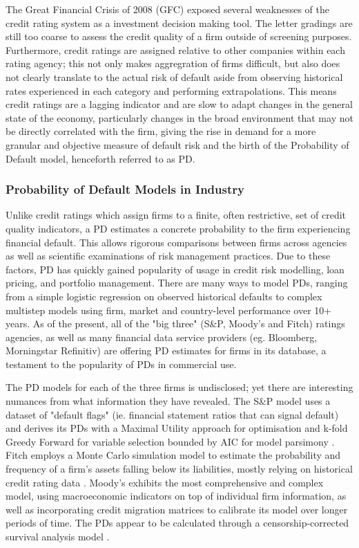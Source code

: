 \documentclass[10pt]{article}
\begin{document}
\begin{multicols*}{2}
The Great Financial Crisis of 2008 (GFC) exposed several weaknesses of the credit rating system as a investment decision making tool. The letter gradings are still too coarse to assess the credit quality of a firm outside of screening purposes.
Furthermore, credit ratings are assigned relative to other companies within each rating agency; this not only makes aggregration of firms difficult, but also does not clearly translate to the actual risk of default aside from observing historical rates experienced in each category and performing extrapolations.
This means credit ratings are a lagging indicator and are slow to adapt changes in the general state of the economy, particularly changes in the broad environment that may not be directly correlated with the firm, giving the rise in demand for a more granular and objective measure of default risk and the birth of the Probability of Default model, henceforth referred to as PD.
    
\subsubsection{Probability of Default Models in Industry}\label{industry}

Unlike credit ratings which assign firms to a finite, often restrictive, set of credit quality indicators, a PD estimates a concrete probability to the firm experiencing financial default.
This allows rigorous comparisons between firms across agencies as well as scientific examinations of risk management practices. Due to these factors, PD has quickly gained popularity of usage in credit risk modelling, loan pricing, and portfolio management.
There are many ways to model PDs, ranging from a simple logistic regression on observed historical defaults to complex multistep models using firm, market and country-level performance over 10+ years. 
As of the present, all of the "big three" (S\&P, Moody's and Fitch) ratings agencies, as well as many financial data service providers (eg. Bloomberg, Morningstar Refinitiv) are offering PD estimates for firms in its database, a testament to the popularity of PDs in commercial use.

The PD models for each of the three firms is undisclosed; yet there are interesting numances from what information they have revealed. 
The S\&P model uses a dataset of "default flags" (ie. financial statement ratios that can signal default) and derives its PDs with a Maximal Utility approach for optimisation and k-fold Greedy Forward for variable selection bounded by AIC for model parsimony \citep{SP-PD-methodology}. 
Fitch employs a Monte Carlo simulation model to estimate the probability and frequency of a firm's assets falling below its liabilities, mostly relying on historical credit rating data \citep{Fitch-PD-methodology}. 
Moody's exhibits the most comprehensive and complex model, using macroeconomic indicators on top of individual firm information, as well as incorporating credit migration matrices to calibrate its model over longer periods of time. The PDs appear to be calculated through a censorship-corrected survival analysis model \citep{Moodys-PD-methodology}.


\end{multicols*}
\end{document}
